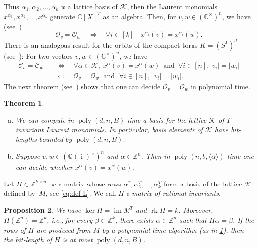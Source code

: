 \documentclass[10pt,a4paper]{article}
\newtheorem{theorem}{Theorem}[section]
\newtheorem{proposition}[theorem]{Proposition}
\theoremstyle{definition}
\newenvironment{alphaenumerate}{\begin{enumerate}[(a)]}{\end{enumerate}}
\DeclareMathOperator{\rk}{rk}
\DeclareMathOperator{\poly}{poly}
\DeclareMathOperator{\ii}{i}
\DeclareMathOperator{\ran}{im}
\newcommand{\QQ}{\mathbb{Q}}
\newcommand{\CC}{\mathbb{C}}
\newcommand{\ZZ}{\mathbb{Z}}
\newcommand{\OO}{\ensuremath{\mathcal{O}}}
\newcommand{\KK}{\ensuremath{\mathcal{C}}}
\numberwithin{equation}{section}
\begin{document}
Thus $\alpha_1,\alpha_2,\dots,\alpha_k$ is a lattice basis of $\mathcal{K}$,
then the Laurent monomials $x^{\alpha_1},x^{\alpha_2},\dots,x^{\alpha_k}$ generate
$\CC[X]^T$ as an algebra. Then, for $v,w\in(\CC^\times)^n$, we have
(see~\cite[Proposition 4.1]{torus})
\begin{equation}\label{prop:t-invariants}
\OO_v= \OO_w \quad \iff \quad \forall i\in [k] \quad x^{\alpha_i}(v)=x^{\alpha_i}(w) .
\end{equation}
There is an analogous result for the orbits of the compact torus $K=(S^1)^d$
(see~\cite[Proposition~8.1]{torus}):
For two vectors $v,w\in(\CC^\times)^n$, we have
\begin{equation}\label{prop:k-invariants}
\begin{split}
	\KK_v=\KK_w\quad &\iff\quad \forall \alpha\in\mathcal{K}, \;
     x^{\alpha}(v)=x^{\alpha}(w)\,\text{ and }\, \forall i\in [n], |v_i|=|w_i|\\
	         &\iff\quad \OO_v = \OO_w \;\text{ and }\;\forall i\in [n], \, |v_i|=|w_i|.
\end{split}
\end{equation}
The next theorem (see~\cite[Corollary~4.4 and Proposition~5.5]{torus})
shows that one can decide $\OO_v=\OO_w$ in polynomial time.

\begin{theorem}
\label{thm:basis-and-equality}
	\begin{alphaenumerate}
		\item\label{it:basis 1}
             We can compute in $\poly(d,n,B)$-time a basis for the lattice $\mathcal{K}$ of $T$-invariant
             Laurent monomials. In particular, basis elements of $\mathcal{K}$ have bit-lengths bounded by $\poly(d,n,B)$.
		\item\label{it:basis 2}
            Suppose $v,w\in(\QQ(\ii)^\times)^n$ and $\alpha\in\ZZ^n$. Then in $\poly(n,b,\langle \alpha\rangle)$-time
            one can decide whether $x^{\alpha}(v)=x^{\alpha}(w)$.
	\end{alphaenumerate}
\end{theorem}

Let $H\in\ZZ^{k\times n}$ be a matrix whose rows $\alpha_1^T,\alpha_2^T,\dots,\alpha_k^T$ form a basis of the lattice $\mathcal{K}$ defined by~$M$, see \cref{eq:def-L}.
We call $H$ a \textit{matrix of rational invariants}.

\begin{proposition}\label{prop:allaboutH}
We have $\ker H = \ran M^T$ and $\rk H=k$.
Moreover, $H(\ZZ^n)=\ZZ^k$, i.e., for every $\beta\in\ZZ^k$,
there exists $\alpha\in\ZZ^n$ such that $H\alpha=\beta$.
If the rows of $H$ are produced from $M$ by
a polynomial time algorithm (as in \cref{thm:basis-and-equality}),
then the bit-length of $H$ is at most $\poly(d,n,B)$.
\end{proposition}
\end{document}
